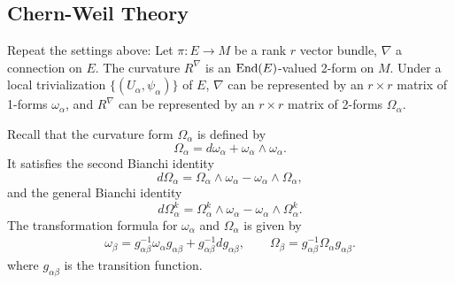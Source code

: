 \subsection{Chern-Weil Theory}
Repeat the settings above: 
Let $\pi:E\to M$ be a rank $r$ vector bundle, 
$\nabla$ a connection on $E$.
The curvature $R^\nabla$ is an ${\rm End}(E)$-valued 2-form on $M$. 
Under a local trivialization $\{(U_\alpha,\psi_\alpha)\}$ of $E$, 
$\nabla$ can be represented by an $r\times r$ matrix of 1-forms $\omega_\alpha$, 
and $R^\nabla$ can be represented by an $r\times r$ matrix of 2-forms $\Omega_\alpha$. 

Recall that the curvature form $\Omega_\alpha$ is defined by 
\begin{equation*}
    \Omega_\alpha = d\omega_\alpha + \omega_\alpha\wedge\omega_\alpha.
\end{equation*}
It satisfies the second Bianchi identity
\begin{equation*}
    d\Omega_\alpha = \Omega_\alpha\wedge\omega_\alpha - \omega_\alpha\wedge\Omega_\alpha,
\end{equation*}
and the general Bianchi identity
\begin{equation*}
    d\Omega_\alpha^k = \Omega_\alpha^k\wedge\omega_\alpha - \omega_\alpha\wedge\Omega_\alpha^k.
\end{equation*}
The transformation formula for $\omega_\alpha$ and $\Omega_\alpha$ is given by
\begin{gather*}
\omega_\beta = g_{\alpha\beta}^{-1}\omega_\alpha g_{\alpha\beta} 
+ g_{\alpha\beta}^{-1}dg_{\alpha\beta}, \qquad 
\Omega_\beta = g_{\alpha\beta}^{-1}\Omega_\alpha g_{\alpha\beta}.
\end{gather*}
where $g_{\alpha\beta}$ is the transition function. 


